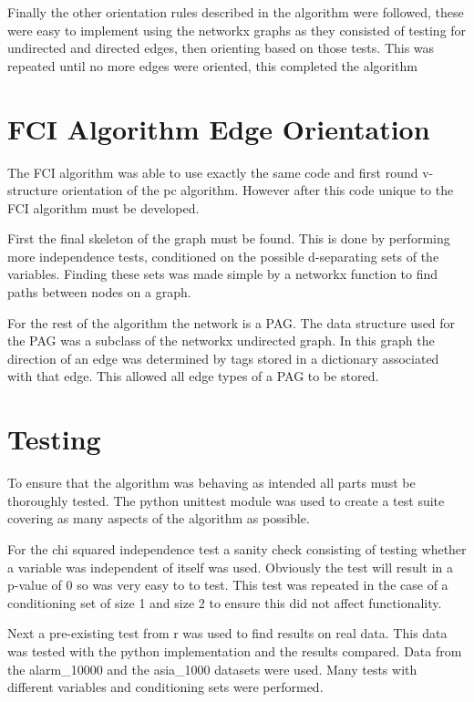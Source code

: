 \documentclass{UoYCSproject}
\begin{document}
Finally the other orientation rules described in the algorithm were followed, these were easy to implement using the networkx graphs as they consisted of testing for undirected and directed edges, then orienting based on those tests. This was repeated until no more edges were oriented, this completed the algorithm

\section{FCI Algorithm Edge Orientation}

The FCI algorithm was able to use exactly the same code and first round v-structure orientation of the pc algorithm. However after this code unique to the FCI algorithm must be developed.

First the final skeleton of the graph must be found. This is done by performing more independence tests, conditioned on the possible d-separating sets of the variables. Finding these sets was made simple by a networkx function to find paths between nodes on a graph.

For the rest of the algorithm the network is a PAG. The data structure used for the PAG was a subclass of the networkx undirected graph. In this graph the direction of an edge was determined by tags stored in a dictionary associated with that edge. This allowed all edge types of a PAG to be stored. 




\section{Testing}

To ensure that the algorithm was behaving as intended all parts must be thoroughly tested. The python unittest module was used to create a test suite covering as many aspects of the algorithm as possible.

For the chi squared independence test a sanity check consisting of testing whether a variable was independent of itself was used. Obviously the test will result in a p-value of 0 so was very easy to to test. This test was repeated in the case of a conditioning set of size 1 and size 2 to ensure this did not affect functionality.

Next a pre-existing test from r was used to find results on real data. This data was tested with the python implementation and the results compared. Data from the alarm\_10000 and the asia\_1000 datasets were used. Many tests with different variables and conditioning sets were performed.
\end{document}
